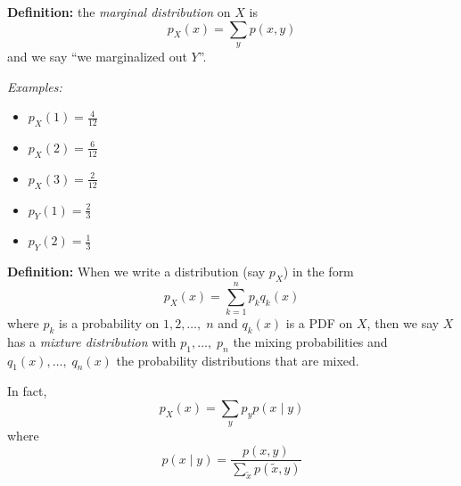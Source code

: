 \documentclass[12pt]{article}
\begin{document}
        \textbf{Definition:} the \emph{marginal distribution} on $X$ is 
        \[p_X(x) = \sum_y p(x, y)\]
        and we say ``we marginalized out $Y$''.

        \emph{Examples:}
        \begin{itemize}
            \item $p_X(1) = \frac{4}{12}$
            \item $p_X(2) = \frac{6}{12}$
            \item $p_X(3) = \frac{2}{12}$
            \item $p_Y(1) = \frac{2}{3}$
            \item $p_Y(2) = \frac{1}{3}$
        \end{itemize}

        \textbf{Definition:} When we write a distribution (say $p_X$) in the form 
        \[p_X(x) = \sum_{k=1}^n p_k q_k(x)\]
        where $p_k$ is a probability on $1, 2, \dots,\; n$ and $q_k(x)$ is a PDF on $X$, then we say $X$ has a \emph{mixture distribution} with $p_1, \dots,\; p_n$ the mixing probabilities and $q_1(x), \dots,\; q_n(x)$ the probability distributions that are mixed.
        
        In fact, 
        \[p_X(x) = \sum_y p_y p(x \; | \; y)\]
        where 
        \[p(x \; | \; y) = \frac{p(x, y)}{\sum_{\tilde x} p(\tilde x, y)}\]
\end{document}

